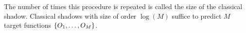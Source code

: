 \documentclass[
aps,
pra,
twocolumn,
floatfix,
]{revtex4-2}
\theoremstyle{plain}
\newtheorem{theorem}{Theorem}
\newtheorem{lemma}{Lemma}
\theoremstyle{definition}
\newtheorem{definition}{Definition}
\newcommand{\ob}{O}
\newcommand{\dm}{\rho}
\newcommand{\shadow}{\textup{shadow}}
\newcommand{\U}{U}
\begin{document}
The number of times this procedure is repeated is called the size of the classical shadow. 
Classical shadows with size of order $\log(M)$ suffice to predict $M$ target functions $\qty{\ob_1,\dots,\ob_M}$.
\end{document}
